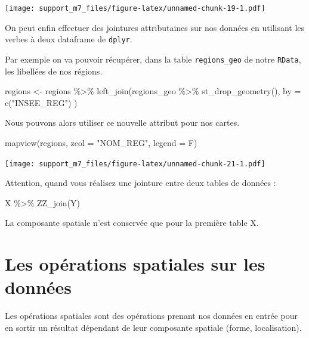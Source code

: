 \documentclass[
]{book}
\newenvironment{Shaded}{\begin{snugshade}}{\end{snugshade}}
\newcommand{\AttributeTok}[1]{\textcolor[rgb]{0.77,0.63,0.00}{#1}}
\newcommand{\FunctionTok}[1]{\textcolor[rgb]{0.00,0.00,0.00}{#1}}
\newcommand{\NormalTok}[1]{#1}
\newcommand{\OtherTok}[1]{\textcolor[rgb]{0.56,0.35,0.01}{#1}}
\newcommand{\SpecialCharTok}[1]{\textcolor[rgb]{0.00,0.00,0.00}{#1}}
\newcommand{\StringTok}[1]{\textcolor[rgb]{0.31,0.60,0.02}{#1}}
\begin{document}
\texttt{[image: support\_m7\_files/figure-latex/unnamed-chunk-19-1.pdf]}

On peut enfin effectuer des jointures attributaines sur nos données en utilisant les verbes à deux dataframe de \texttt{dplyr}.

Par exemple on va pouvoir récupérer, dans la table \texttt{regions\_geo} de notre \texttt{RData}, les libellées de nos régions.

\begin{Shaded}
\begin{Highlighting}[]
\NormalTok{regions }\OtherTok{\textless{}{-}}\NormalTok{ regions }\SpecialCharTok{\%\textgreater{}\%}
  \FunctionTok{left\_join}\NormalTok{(regions\_geo }\SpecialCharTok{\%\textgreater{}\%}
    \FunctionTok{st\_drop\_geometry}\NormalTok{(),}
  \AttributeTok{by =} \FunctionTok{c}\NormalTok{(}\StringTok{"INSEE\_REG"}\NormalTok{)}
\NormalTok{  )}
\end{Highlighting}
\end{Shaded}

Nous pouvons alors utiliser ce nouvelle attribut pour nos cartes.

\begin{Shaded}
\begin{Highlighting}[]
\FunctionTok{mapview}\NormalTok{(regions, }\AttributeTok{zcol =} \StringTok{"NOM\_REG"}\NormalTok{, }\AttributeTok{legend =}\NormalTok{ F)}
\end{Highlighting}
\end{Shaded}

\texttt{[image: support\_m7\_files/figure-latex/unnamed-chunk-21-1.pdf]}

\begin{rmdnote}
Attention, quand vous réalisez une jointure entre deux tables de données
:

X \%\textgreater\% ZZ\_join(Y)

La composante spatiale n'est conservée que pour la première table X.
\end{rmdnote}

\hypertarget{les-opuxe9rations-spatiales-sur-les-donnuxe9es}{%
\chapter{Les opérations spatiales sur les données}\label{les-opuxe9rations-spatiales-sur-les-donnuxe9es}}

Les opérations spatiales sont des opérations prenant nos données en entrée pour en sortir un résultat dépendant de leur composante spatiale (forme, localisation).
\end{document}
